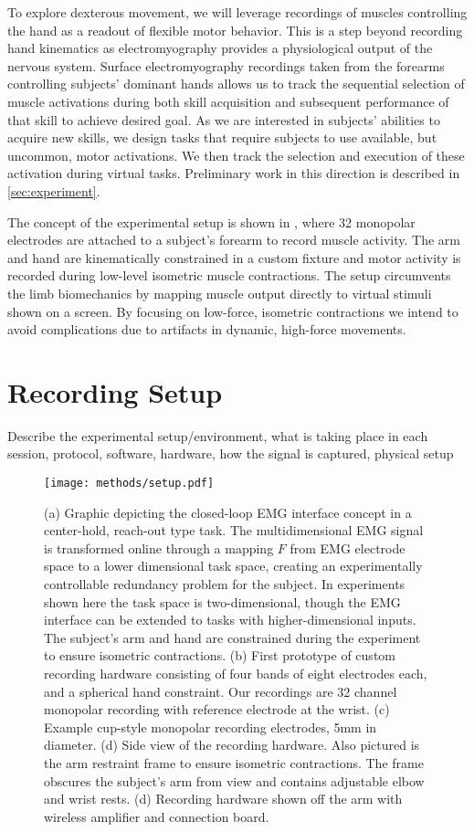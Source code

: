 \documentclass[../main.tex]{subfiles}
\begin{document}
To explore dexterous movement, we will leverage recordings of muscles controlling the hand as a readout of flexible motor behavior. This is a step beyond recording hand kinematics as electromyography provides a physiological output of the nervous system. Surface electromyography recordings taken from the forearms controlling subjects' dominant hands allows us to track the sequential selection of muscle activations during both skill acquisition and subsequent performance of that skill to achieve desired goal. As we are interested in subjects' abilities to acquire new skills, we design tasks that require subjects to use available, but uncommon, motor activations. We then track the selection and execution of these activation during virtual tasks. Preliminary work in this direction is described in \cref{sec:experiment}.

The concept of the experimental setup is shown in , where 32 monopolar electrodes are attached to a subject's forearm to record muscle activity. The arm and hand are kinematically constrained in a custom fixture and motor activity is recorded during low-level isometric muscle contractions. The setup circumvents the limb biomechanics by mapping muscle output directly to virtual stimuli shown on a screen. By focusing on low-force, isometric contractions we intend to avoid complications due to artifacts in dynamic, high-force movements.


\section{Recording Setup}\label{hardware}

Describe the experimental setup/environment, what is taking place in each session, protocol, software, hardware, how the signal is captured, physical setup


\begin{figure}
\centering
\texttt{[image: methods/setup.pdf]}
\caption[Experimental setup prototype]{(a) Graphic depicting the closed-loop EMG interface concept in a center-hold, reach-out type task. The multidimensional EMG signal is transformed online through a mapping $F$ from EMG electrode space to a lower dimensional task space, creating an experimentally controllable redundancy problem for the subject. In experiments shown here the task space is two-dimensional, though the EMG interface can be extended to tasks with higher-dimensional inputs. The subject's arm and hand are constrained during the experiment to ensure isometric contractions. (b) First prototype of custom recording hardware consisting of four bands of eight electrodes each, and a spherical hand constraint. Our recordings are 32 channel monopolar recording with reference electrode at the wrist. (c) Example cup-style monopolar recording electrodes, 5mm in diameter. (d) Side view of the recording hardware. Also pictured is the arm restraint frame to ensure isometric contractions. The frame obscures the subject's arm from view and contains adjustable elbow and wrist rests. (d) Recording hardware shown off the arm with wireless amplifier and connection board.}\label{fig:setup}
\end{figure}
\end{document}
